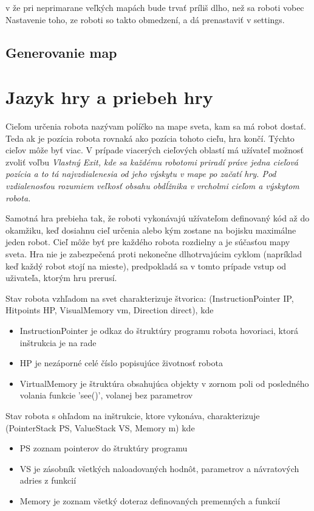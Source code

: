 v  že pri neprimarane veľkých mapách bude trvať príliš dlho, než sa roboti vobec  
Nastavenie toho, ze roboti so takto obmedzení, a dá prenastaviť v settings.%
\subsection{Generovanie map}%
\section{Jazyk hry a priebeh hry} %
\begin{definicia}
Cieľom určenia robota nazývam políčko na mape sveta, kam sa má robot dostať. Teda ak je pozícia robota rovnaká ako pozícia tohoto cieľu, hra končí. Týchto cieľov môže byť viac. V prípade viacerých cieľových oblastí má užívateľ možnosť zvoliť voľbu \it{Vlastný Exit}, kde sa každému robotomi priradí práve jedna cieľová pozícia a to tá najvzdialenesia od jeho výskytu v mape po začatí hry.
Pod vzdialenosťou rozumiem veľkosť obsahu obdĺžnika v vrcholmi cieľom a výskytom robota. %
\end{definicia}

Samotná hra prebieha tak, že roboti vykonávajú užívateľom definovaný kód až do okamžiku, keď dosiahnu cieľ určenia alebo kým zostane na bojisku maximálne jeden robot. Cieľ môže byť pre každého robota rozdielny a je súčasťou mapy sveta. Hra nie je zabezpečená proti nekonečne dlhotrvajúcim cyklom (napríklad keď každý robot stojí na mieste), predpokladá sa v tomto prípade vstup od uživateľa, ktorým hru prerusí.

\begin{definicia}
Stav robota vzhľadom na svet charakterizuje štvorica: (InstructionPointer IP, Hitpoints HP, VisualMemory vm, Direction direct), kde 
\begin{itemize}
\item InstructionPointer je odkaz do štruktúry programu robota hovoriaci, ktorá inštrukcia je na rade
\item HP je nezáporné celé číslo popisujúce životnosť robota
\item VirtualMemory je štruktúra obsahujúca objekty v zornom poli od posledného volania funkcie 'see()', volanej bez parametrov 
\end{itemize}
Stav robota s ohľadom na inštrukcie, ktore vykonáva, charakterizuje (PointerStack PS, ValueStack VS, Memory m) kde
\begin{itemize}
\item PS zoznam pointerov do štruktúry programu
\item VS je zásobník všetkých naloadovaných hodnôt, parametrov  a návratových adries z funkcií
\item Memory je zoznam všetký doteraz definovaných premenných a funkcií
\end{itemize}
\label{StavRobota}
\end{definicia}

